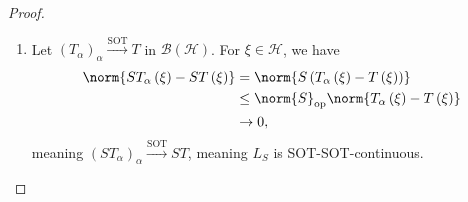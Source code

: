 \documentclass[10pt]{mypackage}
\begin{document}
\begin{proof}\hfill
  \begin{enumerate}[(1)]
    \item Let $\left(T_{\alpha}\right)_{\alpha}\xrightarrow{\text{SOT}}T$ in $\mathcal{B}\left(\mathcal{H}\right)$. For $\xi\in \mathcal{H}$, we have
      \begin{align*}
        \norm{ST_{\alpha}\left(\xi\right) - ST\left(\xi\right)} &= \norm{S\left(T_{\alpha}\left(\xi\right) - T\left(\xi\right)\right)}\\
                                                                &\leq \norm{S}_{\text{op}}\norm{T_{\alpha}\left(\xi\right) - T\left(\xi\right)}\\
                                                                &\rightarrow 0,
      \end{align*}
      meaning $\left(ST_{\alpha}\right)_{\alpha}\xrightarrow{\text{SOT}}ST$, meaning $L_S$ is SOT-SOT-continuous.\newline


\end{enumerate}
\end{proof}
\end{document}
